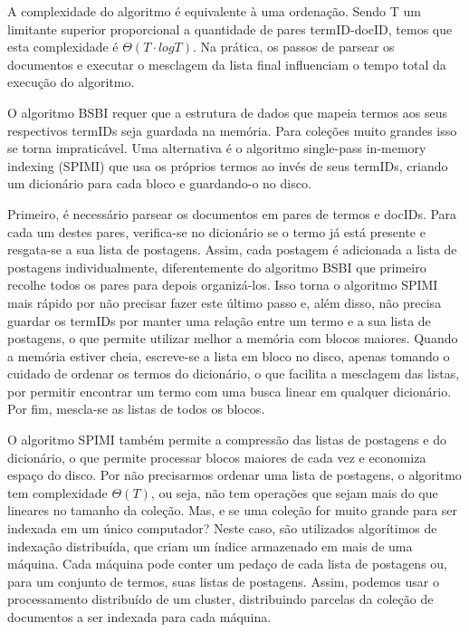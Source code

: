 A complexidade do algoritmo é equivalente à uma ordenação. Sendo T um limitante superior proporcional a quantidade de pares termID-docID, temos que esta complexidade é $\Theta( T \cdot log T )$. Na prática, os passos de parsear os documentos e executar o mesclagem da lista final influenciam o tempo total da execução do algoritmo.

O algoritmo BSBI requer que a estrutura de dados que mapeia termos aos seus respectivos termIDs seja guardada na memória. Para coleções muito grandes isso se torna impraticável. Uma alternativa é o algoritmo single-pass in-memory indexing (SPIMI) que usa os próprios termos ao invés de seus termIDs, criando um dicionário para cada bloco e guardando-o no disco. 

Primeiro, é necessário parsear os documentos em pares de termos e docIDs. Para cada um destes pares, verifica-se no dicionário se o termo já está presente e resgata-se a sua lista de postagens. Assim, cada postagem é adicionada a lista de postagens individualmente, diferentemente do algoritmo BSBI que primeiro recolhe todos os pares para depois organizá-los. Isso torna o algoritmo SPIMI mais rápido por não precisar fazer este último passo e, além disso, não precisa guardar os termIDs por manter uma relação entre um termo e a sua lista de postagens, o que permite utilizar melhor a memória com blocos maiores. Quando a memória estiver cheia, escreve-se a lista em bloco no disco, apenas tomando o cuidado de ordenar os termos do dicionário, o que facilita a mesclagem das listas, por permitir encontrar um termo com uma busca linear em qualquer dicionário. Por fim, mescla-se as listas de todos os blocos. 

O algoritmo SPIMI também permite a compressão das listas de postagens e do dicionário, o que permite processar blocos maiores de cada vez e economiza espaço do disco. Por não precisarmos ordenar uma lista de postagens, o algoritmo tem complexidade $\Theta( T )$, ou seja, não tem operações que sejam mais do que lineares no tamanho da coleção.
Mas, e se uma coleção for muito grande para ser indexada em um único computador? Neste caso, são utilizados algorítimos de indexação distribuída, que criam um índice armazenado em mais de uma máquina. Cada máquina pode conter um pedaço de cada lista de postagens ou, para um conjunto de termos, suas listas de postagens. Assim, podemos usar o processamento distribuído de um cluster, distribuindo parcelas da coleção de documentos a ser indexada para cada máquina.

